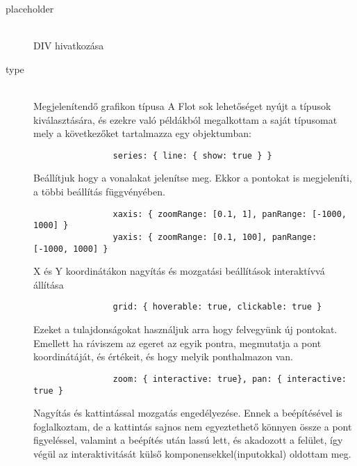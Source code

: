 	\begin{description}
		\item[placeholder] \hfill \\ 
 			DIV hivatkozása
 		 \item[type] \hfill \\ 
 			Megjelenítendő grafikon típusa
 			\newline
 			A Flot sok lehetőséget nyújt a típusok kiválasztására, és ezekre való példákból megalkottam a saját típusomat mely a következőket tartalmazza egy objektumban:
	 		\begin{verbatim}
				series: { line: { show: true } } 
	 		\end{verbatim}
			Beállítjuk hogy a vonalakat jelenítse meg. Ekkor a pontokat is megjeleníti, a többi beállítás függvényében.
	 		
	 		\begin{verbatim}
				xaxis: { zoomRange: [0.1, 1], panRange: [-1000, 1000] }
				yaxis: { zoomRange: [0.1, 100], panRange: [-1000, 1000] }
	 		\end{verbatim} 
	 		X és Y koordinátákon nagyítás és mozgatási beállítások interaktívvá állítása
		 	\begin{verbatim}
				grid: { hoverable: true, clickable: true }
		 	\end{verbatim} 
		 	Ezeket a tulajdonságokat használjuk arra hogy felvegyünk új pontokat.\newline
		 	Emellett ha ráviszem az egeret az egyik pontra, megmutatja a pont koordinátáját, és értékeit, és hogy melyik ponthalmazon van.
		 	\begin{verbatim}
				zoom: { interactive: true}, pan: { interactive: true }
		 	\end{verbatim} 
		 	Nagyítás és kattintással mozgatás engedélyezése. \newline
			Ennek a beépítésével is foglalkoztam, de a kattintás sajnos nem egyeztethető könnyen össze a pont figyeléssel, valamint a beépítés után lassú lett, és akadozott a felület, így végül az interaktivitását külső komponensekkel(inputokkal) oldottam meg.


\end{description}
